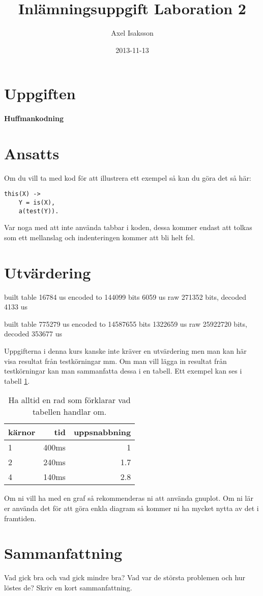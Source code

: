 \documentclass[a4paper, 11pt]{article}
\title{Inlämningsuppgift Laboration 2}
\author{Axel Isaksson}
\date{2013-11-13}
\begin{document}
\maketitle 

\section{Uppgiften}

\paragraph{Huffmankodning}


\section{Ansatts}

Om du vill ta med kod för att illustrera ett exempel så kan du göra det så här:

\begin{verbatim}
this(X) ->
    Y = is(X),
    a(test(Y)).
\end{verbatim}

Var noga med att inte använda tabbar i koden, dessa kommer endast att
tolkas som ett mellanslag och indenteringen kommer att bli helt fel. 

\section{Utvärdering}

built table 16784 us
encoded to 144099 bits 6059 us
raw 271352 bits, decoded 4133 us

built table 775279 us
encoded to 14587655 bits 1322659 us
raw 25922720 bits, decoded 353677 us

Uppgifterna i denna kurs kanske inte kräver en utvärdering men man kan
här visa resultat från testkörningar mm. Om man vill lägga in resultat
från testkörningar kan man sammanfatta dessa i en tabell. Ett exempel
kan ses i tabell \ref{tab:results}. 


\begin{table}
\centering
\begin{tabular}{|l|r|r|}  
\hline
kärnor & tid & uppsnabbning\\
\hline
1 & 400ms & 1\\
\hline
2 & 240ms & 1.7\\
\hline
4 & 140ms & 2.8\\
\hline
\end{tabular}
\caption{Ha alltid en rad som förklarar vad tabellen handlar om.}
\label{tab:results}
\end{table}

Om ni vill ha med en graf så rekommenderas ni att använda gnuplot. Om
ni lär er använda det för att göra enkla diagram så kommer ni ha
mycket nytta av det i framtiden.


\section{Sammanfattning}

Vad gick bra och vad gick mindre bra? Vad var de största problemen och
hur löstes de? Skriv en kort sammanfattning.
\end{document}
